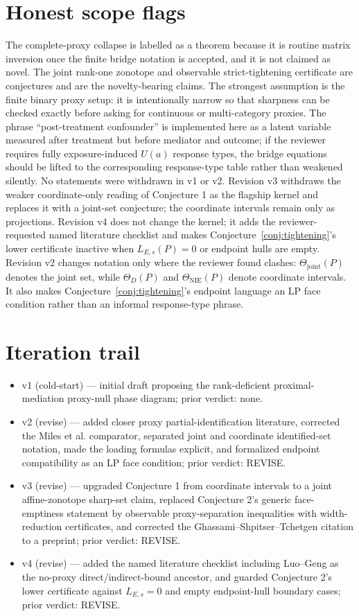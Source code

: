 \documentclass[11pt]{article}
\theoremstyle{definition}
\theoremstyle{plain}
\theoremstyle{remark}
\begin{document}
\section{Honest scope flags}
The complete-proxy collapse is labelled as a theorem because it is routine matrix inversion once the finite bridge notation is accepted, and it is not claimed as novel.  The joint rank-one zonotope and observable strict-tightening certificate are conjectures and are the novelty-bearing claims.  The strongest assumption is the finite binary proxy setup: it is intentionally narrow so that sharpness can be checked exactly before asking for continuous or multi-category proxies.  The phrase ``post-treatment confounder'' is implemented here as a latent variable measured after treatment but before mediator and outcome; if the reviewer requires fully exposure-induced \(U(a)\) response types, the bridge equations should be lifted to the corresponding response-type table rather than weakened silently.  No statements were withdrawn in v1 or v2.  Revision v3 withdraws the weaker coordinate-only reading of Conjecture 1 as the flagship kernel and replaces it with a joint-set conjecture; the coordinate intervals remain only as projections.  Revision v4 does not change the kernel; it adds the reviewer-requested named literature checklist and makes Conjecture~\ref{conj:tightening}'s lower certificate inactive when \(L_{E,s}(P)=0\) or endpoint hulls are empty.
Revision v2 changes notation only where the reviewer found clashes: \(\Theta_{\mathrm{joint}}(P)\) denotes the joint set, while \(\Theta_D(P)\) and \(\Theta_{\mathrm{NIE}}(P)\) denote coordinate intervals.  It also makes Conjecture~\ref{conj:tightening}'s endpoint language an LP face condition rather than an informal response-type phrase.

\section{Iteration trail}
\begin{itemize}
\item v1 (cold-start) --- initial draft proposing the rank-deficient proximal-mediation proxy-null phase diagram; prior verdict: none.
\item v2 (revise) --- added closer proxy partial-identification literature, corrected the Miles et al. comparator, separated joint and coordinate identified-set notation, made the loading formulas explicit, and formalized endpoint compatibility as an LP face condition; prior verdict: REVISE.
\item v3 (revise) --- upgraded Conjecture 1 from coordinate intervals to a joint affine-zonotope sharp-set claim, replaced Conjecture 2's generic face-emptiness statement by observable proxy-separation inequalities with width-reduction certificates, and corrected the Ghassami--Shpitser--Tchetgen citation to a preprint; prior verdict: REVISE.
\item v4 (revise) --- added the named literature checklist including Luo--Geng as the no-proxy direct/indirect-bound ancestor, and guarded Conjecture 2's lower certificate against \(L_{E,s}=0\) and empty endpoint-hull boundary cases; prior verdict: REVISE.
\end{itemize}
\end{document}
